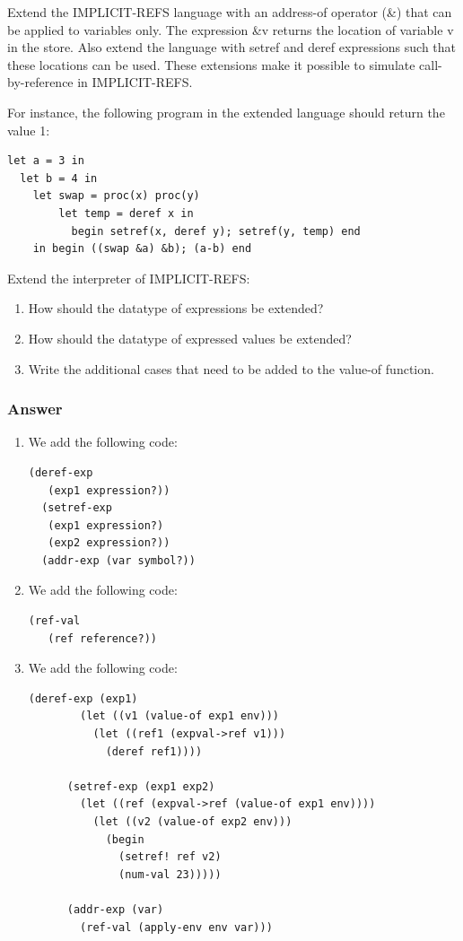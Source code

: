 \documentclass[a4paper]{article}
\begin{document}
Extend the IMPLICIT-REFS language with an address-of operator (\&) that can be applied to variables only. The expression \&v returns the location of variable v in the store. Also extend the language with setref and deref expressions such that these locations can be used. These extensions make it possible to simulate call-by-reference in IMPLICIT-REFS.

For instance, the following program in the extended language should return the value 1:

\begin{lstlisting}[language={CPL}]
let a = 3 in
  let b = 4 in
    let swap = proc(x) proc(y)
        let temp = deref x in
          begin setref(x, deref y); setref(y, temp) end
    in begin ((swap &a) &b); (a-b) end
\end{lstlisting}

Extend the interpreter of IMPLICIT-REFS:
\begin{enumerate}[label=\Alph*]
\item How should the datatype of expressions be extended?
\item How should the datatype of expressed values be extended?
\item Write the additional cases that need to be added to the value-of function.
\end{enumerate}

\subsubsection*{Answer}

\begin{enumerate}[label=\Alph*]
\item We add the following code:
\begin{lstlisting}[language={CPL}]
  (deref-exp
   (exp1 expression?))  
  (setref-exp
   (exp1 expression?)
   (exp2 expression?))
  (addr-exp (var symbol?))
\end{lstlisting}
\item We add the following code:
\begin{lstlisting}[language={CPL}]
  (ref-val
   (ref reference?))
\end{lstlisting}
\item We add the following code:
\begin{lstlisting}[language={CPL}]
      (deref-exp (exp1)
        (let ((v1 (value-of exp1 env)))
          (let ((ref1 (expval->ref v1)))
            (deref ref1))))

      (setref-exp (exp1 exp2)
        (let ((ref (expval->ref (value-of exp1 env))))
          (let ((v2 (value-of exp2 env)))
            (begin
              (setref! ref v2)
              (num-val 23)))))

      (addr-exp (var)
        (ref-val (apply-env env var)))
\end{lstlisting}
\end{enumerate}
\end{document}
